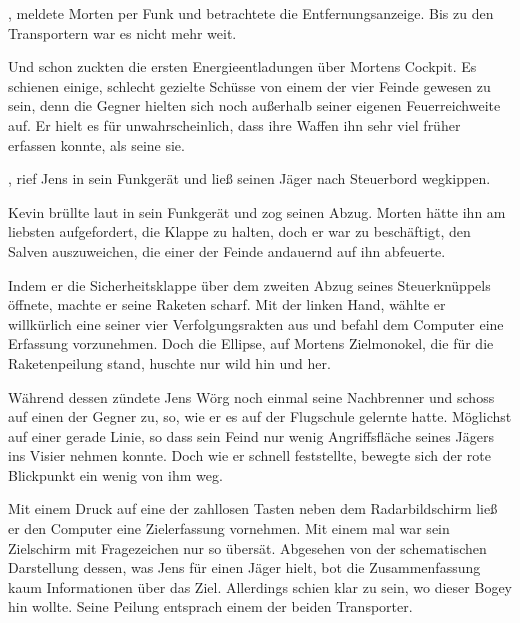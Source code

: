 \par

, meldete Morten per Funk und betrachtete die Entfernungsanzeige. Bis zu den Transportern war es nicht mehr weit.

\par

Und schon zuckten die ersten Energieentladungen über Mortens Cockpit. Es schienen einige, schlecht gezielte Schüsse von einem der vier Feinde gewesen zu sein, denn die Gegner hielten sich noch außerhalb seiner eigenen Feuerreichweite auf. Er hielt es für unwahrscheinlich, dass ihre Waffen ihn sehr viel früher erfassen konnte, als seine sie.

\par

, rief Jens in sein Funkgerät und ließ seinen Jäger nach Steuerbord wegkippen.

\par

Kevin brüllte laut in sein Funkgerät und zog seinen Abzug. Morten hätte ihn am liebsten aufgefordert, die Klappe zu halten, doch er war zu beschäftigt, den Salven auszuweichen, die einer der Feinde andauernd auf ihn abfeuerte.

\par

Indem er die Sicherheitsklappe über dem zweiten Abzug seines Steuerknüppels öffnete, machte er seine Raketen scharf. Mit der linken Hand, wählte er willkürlich eine seiner vier Verfolgungsrakten aus und befahl dem Computer eine Erfassung vorzunehmen. Doch die Ellipse, auf Mortens Zielmonokel, die für die Raketenpeilung stand, huschte nur wild hin und her.

\par

Während dessen zündete Jens Wörg noch einmal seine Nachbrenner und schoss auf einen der Gegner zu, so, wie er es auf der Flugschule gelernte hatte. Möglichst auf einer gerade Linie, so dass sein Feind nur wenig Angriffsfläche seines Jägers ins Visier nehmen konnte. Doch wie er schnell feststellte, bewegte sich der rote Blickpunkt ein wenig von ihm weg.

\par

Mit einem Druck auf eine der zahllosen Tasten neben dem Radarbildschirm ließ er den Computer eine Zielerfassung vornehmen. Mit einem mal war sein Zielschirm mit Fragezeichen nur so übersät. Abgesehen von der schematischen Darstellung dessen, was Jens für einen Jäger hielt, bot die Zusammenfassung kaum Informationen über das Ziel. Allerdings schien klar zu sein, wo dieser Bogey hin wollte. Seine Peilung entsprach einem der beiden Transporter.

